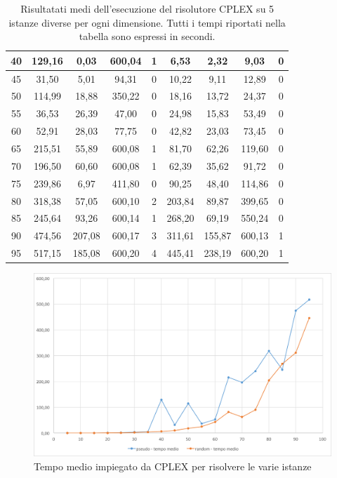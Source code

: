 \begin{table}[htbp]
{\begin{tabular}{c|c|c|c|c|c|c|c|c|}
			\multicolumn{1}{|c|}{40} & 129,16 & 0,03 & 600,04 & 1 & 6,53 & 2,32 & 9,03 & 0 \\ \hline
			\multicolumn{1}{|c|}{45} & 31,50 & 5,01 & 94,31 & 0 & 10,22 & 9,11 & 12,89 & 0 \\ \hline
			\multicolumn{1}{|c|}{50} & 114,99 & 18,88 & 350,22 & 0 & 18,16 & 13,72 & 24,37 & 0 \\ \hline
			\multicolumn{1}{|c|}{55} & 36,53 & 26,39 & 47,00 & 0 & 24,98 & 15,83 & 53,49 & 0 \\ \hline
			\multicolumn{1}{|c|}{60} & 52,91 & 28,03 & 77,75 & 0 & 42,82 & 23,03 & 73,45 & 0 \\ \hline
			\multicolumn{1}{|c|}{65} & 215,51 & 55,89 & 600,08 & 1 & 81,70 & 62,26 & 119,60 & 0 \\ \hline
			\multicolumn{1}{|c|}{70} & 196,50 & 60,60 & 600,08 & 1 & 62,39 & 35,62 & 91,72 & 0 \\ \hline
			\multicolumn{1}{|c|}{75} & 239,86 & 6,97 & 411,80 & 0 & 90,25 & 48,40 & 114,86 & 0 \\ \hline
			\multicolumn{1}{|c|}{80} & 318,38 & 57,05 & 600,10 & 2 & 203,84 & 89,87 & 399,65 & 0 \\ \hline
			\multicolumn{1}{|c|}{85} & 245,64 & 93,26 & 600,14 & 1 & 268,20 & 69,19 & 550,24 & 0 \\ \hline
			\multicolumn{1}{|c|}{90} & 474,56 & 207,08 & 600,17 & 3 & 311,61 & 155,87 & 600,13 & 1 \\ \hline
			\multicolumn{1}{|c|}{95} & 517,15 & 185,08 & 600,20 & 4 & 445,41 & 238,19 & 600,20 & 1 \\ \hline
		\end{tabular}%
	}
	\caption{Risultatati medi dell'esecuzione del risolutore CPLEX su 5 istanze diverse per ogni dimensione. Tutti i tempi riportati nella tabella sono espressi in secondi.}
	\label{tab:cplex-avg}
\end{table}

\begin{figure}[htbp]
	\centering
	\includegraphics[width=.9\textwidth]{immagini/cplex-time.png}
	\caption{Tempo medio impiegato da CPLEX per risolvere le varie istanze}\label{fig:cplex-time}
\end{figure}

